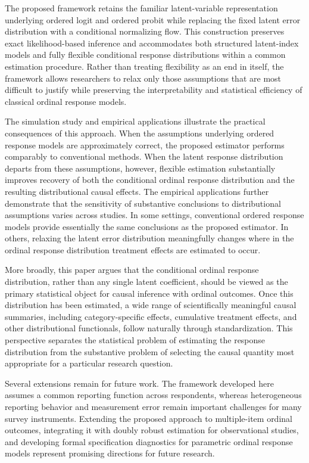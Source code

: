 \documentclass{article}
\begin{document}
The proposed framework retains the familiar latent-variable representation underlying ordered logit and ordered probit while replacing the fixed latent error distribution with a conditional normalizing flow. This construction preserves exact likelihood-based inference and accommodates both structured latent-index models and fully flexible conditional response distributions within a common estimation procedure. Rather than treating flexibility as an end in itself, the framework allows researchers to relax only those assumptions that are most difficult to justify while preserving the interpretability and statistical efficiency of classical ordinal response models.

The simulation study and empirical applications illustrate the practical consequences of this approach. When the assumptions underlying ordered response models are approximately correct, the proposed estimator performs comparably to conventional methods. When the latent response distribution departs from these assumptions, however, flexible estimation substantially improves recovery of both the conditional ordinal response distribution and the resulting distributional causal effects. The empirical applications further demonstrate that the sensitivity of substantive conclusions to distributional assumptions varies across studies. In some settings, conventional ordered response models provide essentially the same conclusions as the proposed estimator. In others, relaxing the latent error distribution meaningfully changes where in the ordinal response distribution treatment effects are estimated to occur.

More broadly, this paper argues that the conditional ordinal response distribution, rather than any single latent coefficient, should be viewed as the primary statistical object for causal inference with ordinal outcomes. Once this distribution has been estimated, a wide range of scientifically meaningful causal summaries, including category-specific effects, cumulative treatment effects, and other distributional functionals, follow naturally through standardization. This perspective separates the statistical problem of estimating the response distribution from the substantive problem of selecting the causal quantity most appropriate for a particular research question.

Several extensions remain for future work. The framework developed here assumes a common reporting function across respondents, whereas heterogeneous reporting behavior and measurement error remain important challenges for many survey instruments. Extending the proposed approach to multiple-item ordinal outcomes, integrating it with doubly robust estimation for observational studies, and developing formal specification diagnostics for parametric ordinal response models represent promising directions for future research.
\end{document}
